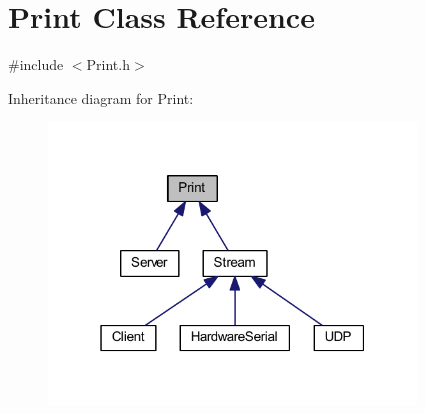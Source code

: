 \hypertarget{class_print}{}\section{Print Class Reference}
\label{class_print}


{\ttfamily \#include $<$Print.\+h$>$}



Inheritance diagram for Print\+:
\nopagebreak
\begin{figure}[H]
\begin{center}
\leavevmode
\includegraphics[width=277pt]{class_print__inherit__graph}
\end{center}
\end{figure}

